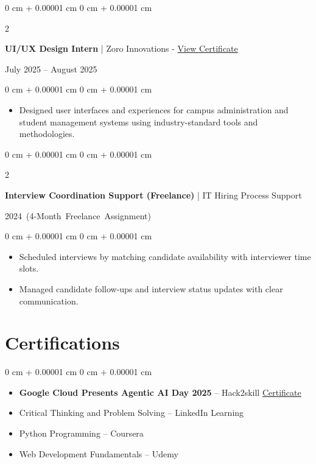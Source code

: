\documentclass[10pt, a4paper]{article}
\newenvironment{highlights}{
    \begin{itemize}[
        topsep=0.06 cm,
        parsep=0.04 cm,
        partopsep=0pt,
        itemsep=0.02 cm,
        leftmargin=0 cm + 10pt
    ]
}{
    \end{itemize}
}
\newenvironment{onecolentry}{
    \begin{adjustwidth}{
        0 cm + 0.00001 cm
    }{
        0 cm + 0.00001 cm
    }
}{
    \end{adjustwidth}
}
\newenvironment{twocolentry}[2][4.5 cm]{
    \onecolentry
    \def\secondColumn{#2}
    \setcolumnwidth{\fill, #1}
    \begin{paracol}{2}
}{
    \switchcolumn \raggedleft \secondColumn
    \end{paracol}
    \endonecolentry
}
\begin{document}
    \begin{twocolentry}{
        July 2025 – August 2025
    }
        \textbf{UI/UX Design Intern} | Zoro Innovations - \href{https://drive.google.com/file/d/1Mdj6kdTXaku3_Z-Vh2tATbli0cOKpZ-h/view?usp=sharing}{View Certificate}
    \end{twocolentry}

    \vspace{0.10 cm}
    \begin{onecolentry}
        \begin{highlights}
            \item Designed user interfaces and experiences for campus administration and student management systems using industry-standard tools and methodologies.
        \end{highlights}
    \end{onecolentry}

    \vspace{0.10 cm}
    \begin{twocolentry}[6.2 cm]{
        \small{\mbox{2024 (4-Month Freelance Assignment)}}
    }
        \textbf{Interview Coordination Support (Freelance)} | IT Hiring Process Support
    \end{twocolentry}

    \vspace{0.10 cm}
    \begin{onecolentry}
        \begin{highlights}
            \item Scheduled interviews by matching candidate availability with interviewer time slots.
            \item Managed candidate follow-ups and interview status updates with clear communication.
        \end{highlights}
    \end{onecolentry}

    \section{Certifications}

    \begin{onecolentry}
        \begin{highlights}
            \item \textbf{Google Cloud Presents Agentic AI Day 2025} – Hack2skill \hfill \href{https://certificate.hack2skill.com/user/aidayideasubmission/2025H2S06AID-I11874}{Certificate}
            \item Critical Thinking and Problem Solving – LinkedIn Learning
            \item Python Programming – Coursera
            \item Web Development Fundamentals – Udemy
        \end{highlights}
    \end{onecolentry}
\end{document}
